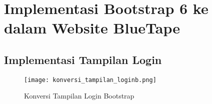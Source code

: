 \chapter{Implementasi Bootstrap 6 ke dalam Website BlueTape}

\section{Implementasi Tampilan Login}

\begin{figure} [H]
	\centering  
	\texttt{[image: konversi\_tampilan\_loginb.png]}  
	\caption{Konversi Tampilan Login Bootstrap} 
\end{figure}